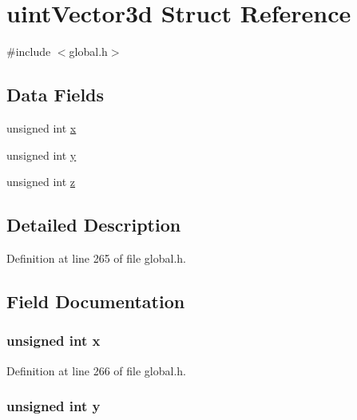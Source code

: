 \hypertarget{structuintVector3d}{\section{uint\-Vector3d Struct Reference}
\label{structuintVector3d}
}


{\ttfamily \#include $<$global.\-h$>$}

\subsection*{Data Fields}
\begin{DoxyCompactItemize}
\item 
unsigned int \hyperlink{structuintVector3d_a676e0da0ef83bbbdf42538e54b97506b}{x}
\item 
unsigned int \hyperlink{structuintVector3d_ac30de26db5f6d1c18c63913729adca7d}{y}
\item 
unsigned int \hyperlink{structuintVector3d_a3d99b005d0fb73033dce14d4a135d01f}{z}
\end{DoxyCompactItemize}


\subsection{Detailed Description}


Definition at line 265 of file global.\-h.



\subsection{Field Documentation}
\hypertarget{structuintVector3d_a676e0da0ef83bbbdf42538e54b97506b}{
\subsubsection[{x}]{\setlength{\rightskip}{0pt plus 5cm}unsigned int x}}\label{structuintVector3d_a676e0da0ef83bbbdf42538e54b97506b}


Definition at line 266 of file global.\-h.

\hypertarget{structuintVector3d_ac30de26db5f6d1c18c63913729adca7d}{
\subsubsection[{y}]{\setlength{\rightskip}{0pt plus 5cm}unsigned int y}}\label{structuintVector3d_ac30de26db5f6d1c18c63913729adca7d}


